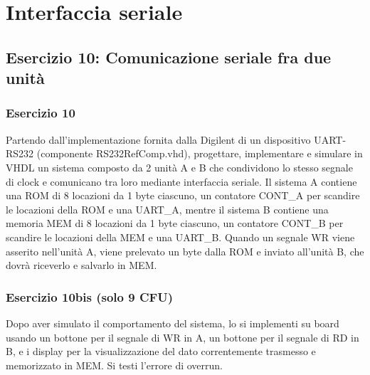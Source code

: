 \chapter{Interfaccia seriale}

\section{Esercizio 10: Comunicazione seriale fra due unità}

\subsection{Esercizio 10}

\begin{traccia}
	Partendo dall'implementazione fornita dalla Digilent di un dispositivo UART-RS232
	(componente RS232RefComp.vhd), progettare, implementare e simulare in VHDL un sistema
	composto da 2 unità A e B che condividono lo stesso segnale di clock e comunicano tra loro
	mediante interfaccia seriale. Il sistema A contiene una ROM di 8 locazioni da 1 byte
	ciascuno, un contatore CONT\_A per scandire le locazioni della ROM e una UART\_A, mentre il
	sistema B contiene una memoria MEM di 8 locazioni da 1 byte ciascuno, un contatore CONT\_B
	per scandire le locazioni della MEM e una UART\_B. Quando un segnale WR viene asserito
	nell'unità A, viene prelevato un byte dalla ROM e inviato all'unità B, che dovrà riceverlo
	e salvarlo in MEM.
\end{traccia}

\progetto
{}

\implementazione
{}

\simulazione
{}

\subsection{Esercizio 10bis (solo 9 CFU)}

\begin{traccia}
	Dopo aver simulato il comportamento del sistema, lo si implementi su board usando un
	bottone per il segnale di WR in A, un bottone per il segnale di RD in B, e i display per la
	visualizzazione del dato correntemente trasmesso e memorizzato in MEM. Si testi l'errore di overrun.
\end{traccia}

\sintesiboard
{}
